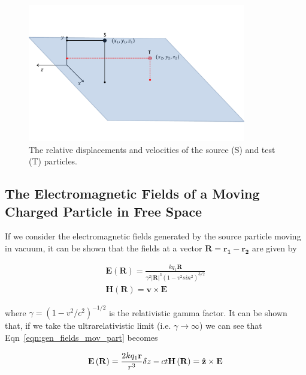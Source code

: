 \begin{figure}
\begin{center}
\includegraphics[width=0.85\textwidth]{Wakefields_and_Impedances/figures/source-witness-pos.pdf}
\end{center}
\caption{The relative displacements and velocities of the source (S) and test (T) particles.}
\label{fig:source_and_wit}
\end{figure} 

\subsection{The Electromagnetic Fields of a Moving Charged Particle in Free Space}

If we consider the electromagnetic fields generated by the source particle moving in vacuum, it can be shown that the fields at a vector $\mathbf{R} = \mathbf{r_{1}} - \mathbf{r_{2}}$ are given by

\begin{align}
\mathbf{E}\left( \mathbf{R}  \right) = \frac{k q_{1}\mathbf{R}}{\gamma^{2}\left| \mathbf{R} \right|^{3} \left( 1 - v^{2}sin^{2}\right)^{3/2} } \\
\mathbf{H}\left( \mathbf{R}  \right) = \mathbf{v} \times \mathbf{E}
\label{eqn:gen_fields_mov_part}
\end{align}

where $\gamma =(1- v^{2}/c^{2})^{-1/2}$ is the relativistic gamma factor. It can be shown that, if we take the ultrarelativistic limit (i.e. $\gamma \rightarrow \infty$) we can see that Eqn~\ref{eqn:gen_fields_mov_part} becomes

\begin{equation}
\mathbf{E}\left( \mathbf{R}  \right) = \frac{2kq_{1}\mathbf{r}}{r^{3}}\delta{z-ct} \\
\mathbf{H}\left( \mathbf{R}  \right) = \mathbf{\hat{z}} \times \mathbf{E}
\label{eqn:ultrarel_field_eqn}
\end{equation}

